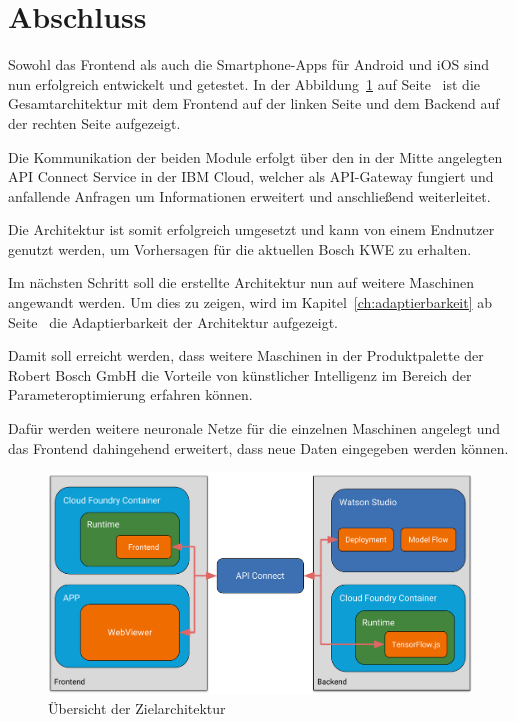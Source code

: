 \section{Abschluss}
Sowohl das Frontend als auch die Smartphone-Apps für Android und iOS sind nun erfolgreich entwickelt und getestet. In
der Abbildung~\ref{fig:umsetzung_zielarchitektur_4} auf Seite~\pageref{fig:umsetzung_zielarchitektur_4} ist die
Gesamtarchitektur mit dem Frontend auf der linken Seite und dem Backend auf der rechten Seite aufgezeigt.

Die Kommunikation der beiden Module erfolgt über den in der Mitte angelegten API Connect Service in der IBM Cloud,
welcher als API-Gateway fungiert und anfallende Anfragen um Informationen erweitert und anschließend weiterleitet.

Die Architektur ist somit erfolgreich umgesetzt und kann von einem Endnutzer genutzt werden, um Vorhersagen für die
aktuellen Bosch KWE zu erhalten.

Im nächsten Schritt soll die erstellte Architektur nun auf weitere Maschinen angewandt werden. Um dies zu zeigen, wird
im Kapitel~\ref{ch:adaptierbarkeit} ab Seite~\pageref{ch:adaptierbarkeit} die Adaptierbarkeit der Architektur
aufgezeigt.

Damit soll erreicht werden, dass weitere Maschinen in der Produktpalette der Robert Bosch GmbH die Vorteile von
künstlicher Intelligenz im Bereich der Parameteroptimierung erfahren können.

Dafür werden weitere neuronale Netze für die einzelnen Maschinen angelegt und das Frontend dahingehend erweitert,
dass neue Daten eingegeben werden können.

\begin{figure}[h]
    \centering
    \includegraphics[width=\textwidth]{images/kapitel_4/architektur_uebersicht.pdf}
    \caption{Übersicht der Zielarchitektur}
    \label{fig:umsetzung_zielarchitektur_4}
\end{figure}
